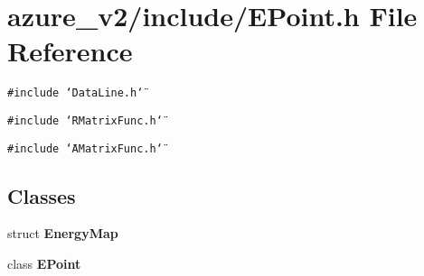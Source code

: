 \section{azure\_\-v2/include/EPoint.h File Reference}
\label{EPoint_8h}
{\tt \#include \char`\"{}Data\-Line.h\char`\"{}}\par
{\tt \#include \char`\"{}RMatrix\-Func.h\char`\"{}}\par
{\tt \#include \char`\"{}AMatrix\-Func.h\char`\"{}}\par
\subsection*{Classes}
\begin{CompactItemize}
\item 
struct \bf{Energy\-Map}
\item 
class \bf{EPoint}
\end{CompactItemize}
